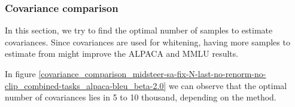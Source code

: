 \subsubsection{Covariance comparison}

In this section, we try to find the optimal number of samples to estimate covariances. Since covariances are used for whitening, having more samples to estimate from might improve the ALPACA and MMLU results.

In figure \ref{covariance_comparison_midsteer-sa-fix-N-last-no-renorm-no-clip_combined-tasks_alpaca-bleu_beta-2.0} we can observe that the optimal number of covariances lies in 5 to 10 thousand, depending on the method.
